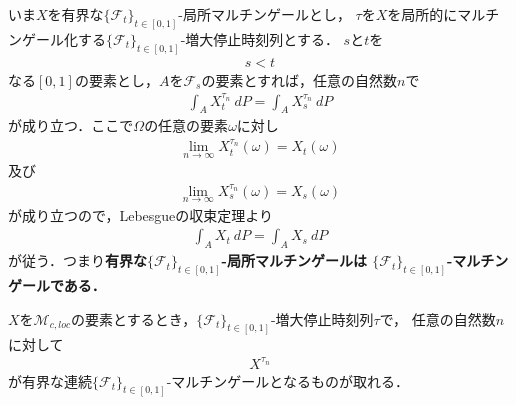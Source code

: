 	いま$X$を有界な$\{\mathscr{F}_{t}\}_{t \in [0,1]}$-局所マルチンゲールとし，
	$\tau$を$X$を局所的にマルチンゲール化する$\{\mathscr{F}_{t}\}_{t \in [0,1]}$-増大停止時刻列とする．
	$s$と$t$を
	\begin{align}
		s < t
	\end{align}
	なる$[0,1]$の要素とし，$A$を$\mathscr{F}_{s}$の要素とすれば，任意の自然数$n$で
	\begin{align}
		\int_{A} X^{\tau_{n}}_{t}\ dP = \int_{A} X^{\tau_{n}}_{s}\ dP
	\end{align}
	が成り立つ．ここで$\Omega$の任意の要素$\omega$に対し
	\begin{align}
		\lim_{n \to \infty} X^{\tau_{n}}_{t}(\omega) = X_{t}(\omega)
	\end{align}
	及び
	\begin{align}
		\lim_{n \to \infty} X^{\tau_{n}}_{s}(\omega) = X_{s}(\omega)
	\end{align}
	が成り立つので，Lebesgueの収束定理より
	\begin{align}
		\int_{A} X_{t}\ dP = \int_{A} X_{s}\ dP
	\end{align}
	が従う．つまり{\bf 有界な$\{\mathscr{F}_{t}\}_{t \in [0,1]}$-局所マルチンゲールは
	$\{\mathscr{F}_{t}\}_{t \in [0,1]}$-マルチンゲールである．}
	
	\begin{screen}
		\begin{thm}
			$X$を$\mathscr{M}_{c,loc}$の要素とするとき，$\{\mathscr{F}_{t}\}_{t \in [0,1]}$-増大停止時刻列$\tau$で，
			任意の自然数$n$に対して
			\begin{align}
				X^{\tau_{n}}
			\end{align}
			が有界な連続$\{\mathscr{F}_{t}\}_{t \in [0,1]}$-マルチンゲールとなるものが取れる．
		\end{thm}
	\end{screen}
	
